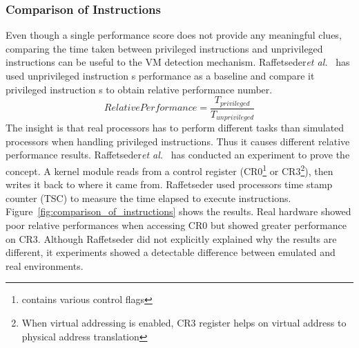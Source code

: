 \subsubsection{Comparison of Instructions}
Even though a single performance score does not provide any meaningful clues, comparing the time taken between privileged instructions and unprivileged instructions can be useful to the VM detection mechanism. Raffetseder{\em et al.}~\cite{raffetseder2007} has used unprivileged instruction \textquotesingle s performance as a baseline and compare it privileged instruction \textquotesingle s to obtain relative performance number.
\begin{equation*}
Relative Performance = \frac{T_{privileged}}{T_{unprivileged}}
\end{equation*}
The insight is that real processors has to perform different tasks than simulated processors when handling privileged instructions. Thus it causes different relative performance results.  Raffetseder{\em et al.}~\cite{raffetseder2007} has conducted an experiment to prove the concept. A kernel module reads from a control register (CR0\footnote{contains various control flags} or CR3\footnote{When virtual addressing is enabled, CR3 register helps on virtual address to physical address translation}), then writes it back to where it came from. Raffetseder used processor\textquotesingle s time stamp counter (TSC) to measure the time elapsed to execute instructions. Figure~\ref{fig:comparison_of_instructions} shows the results. Real hardware showed poor relative performances when accessing CR0 but showed greater performance on CR3. Although Raffetseder did not explicitly explained why the results are different, it experiments showed a detectable difference between emulated and real environments.


